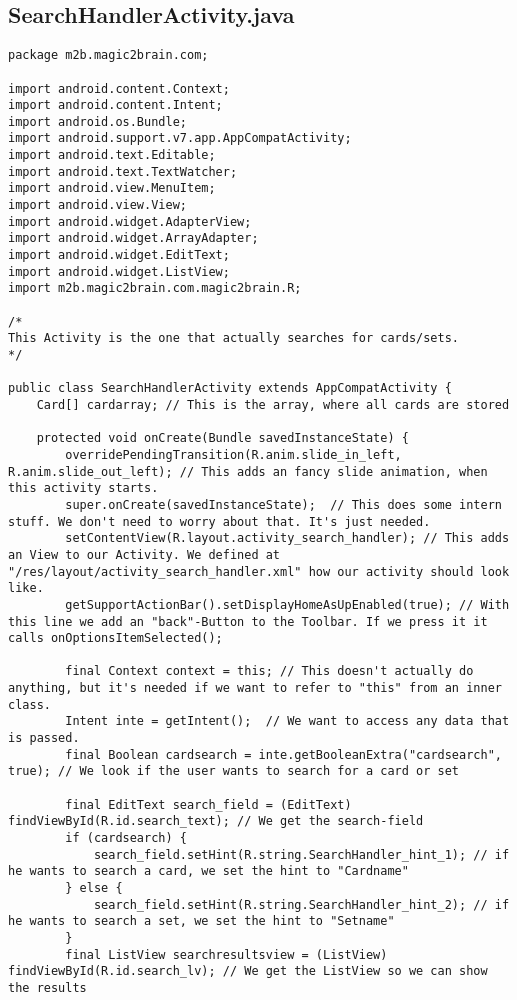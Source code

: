 \subsection*{SearchHandlerActivity.java}
\begin{lstlisting}
package m2b.magic2brain.com;

import android.content.Context;
import android.content.Intent;
import android.os.Bundle;
import android.support.v7.app.AppCompatActivity;
import android.text.Editable;
import android.text.TextWatcher;
import android.view.MenuItem;
import android.view.View;
import android.widget.AdapterView;
import android.widget.ArrayAdapter;
import android.widget.EditText;
import android.widget.ListView;
import m2b.magic2brain.com.magic2brain.R;

/*
This Activity is the one that actually searches for cards/sets.
*/

public class SearchHandlerActivity extends AppCompatActivity {
    Card[] cardarray; // This is the array, where all cards are stored

    protected void onCreate(Bundle savedInstanceState) {
        overridePendingTransition(R.anim.slide_in_left, R.anim.slide_out_left); // This adds an fancy slide animation, when this activity starts.
        super.onCreate(savedInstanceState);  // This does some intern stuff. We don't need to worry about that. It's just needed.
        setContentView(R.layout.activity_search_handler); // This adds an View to our Activity. We defined at "/res/layout/activity_search_handler.xml" how our activity should look like.
        getSupportActionBar().setDisplayHomeAsUpEnabled(true); // With this line we add an "back"-Button to the Toolbar. If we press it it calls onOptionsItemSelected();

        final Context context = this; // This doesn't actually do anything, but it's needed if we want to refer to "this" from an inner class.
        Intent inte = getIntent();  // We want to access any data that is passed.
        final Boolean cardsearch = inte.getBooleanExtra("cardsearch", true); // We look if the user wants to search for a card or set

        final EditText search_field = (EditText) findViewById(R.id.search_text); // We get the search-field
        if (cardsearch) {
            search_field.setHint(R.string.SearchHandler_hint_1); // if he wants to search a card, we set the hint to "Cardname"
        } else {
            search_field.setHint(R.string.SearchHandler_hint_2); // if he wants to search a set, we set the hint to "Setname"
        }
        final ListView searchresultsview = (ListView) findViewById(R.id.search_lv); // We get the ListView so we can show the results


\end{lstlisting}
